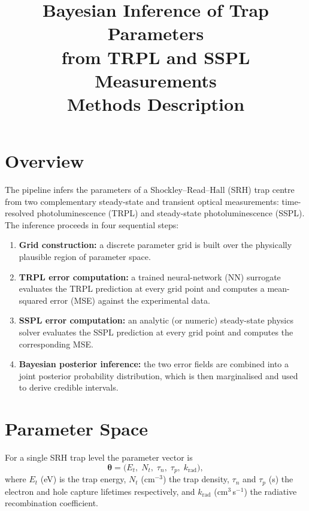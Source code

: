 \documentclass[a4paper,11pt]{article}
\title{\textbf{Bayesian Inference of Trap Parameters\\from TRPL and SSPL Measurements}\\[0.4em]
\large Methods Description}
\author{}
\date{}
\newcommand{\btheta}{\boldsymbol{\theta}}
\begin{document}
\maketitle
\tableofcontents
\newpage

\section{Overview}

The pipeline infers the parameters of a Shockley--Read--Hall (SRH) trap centre
from two complementary steady-state and transient optical measurements:
time-resolved photoluminescence (TRPL) and steady-state photoluminescence
(SSPL). The inference proceeds in four sequential steps:

\begin{enumerate}
  \item \textbf{Grid construction:} a discrete parameter grid is built over
        the physically plausible region of parameter space.
  \item \textbf{TRPL error computation:} a trained neural-network (NN)
        surrogate evaluates the TRPL prediction at every grid point and
        computes a mean-squared error (MSE) against the experimental data.
  \item \textbf{SSPL error computation:} an analytic (or numeric)
        steady-state physics solver evaluates the SSPL prediction at every
        grid point and computes the corresponding MSE.
  \item \textbf{Bayesian posterior inference:} the two error fields are
        combined into a joint posterior probability distribution, which is
        then marginalised and used to derive credible intervals.
\end{enumerate}

\section{Parameter Space}

For a single SRH trap level the parameter vector is
\begin{equation}
  \btheta = \bigl(E_t,\; N_t,\; \tau_n,\; \tau_p,\; k_\mathrm{rad}\bigr),
\end{equation}
where $E_t$ (eV) is the trap energy, $N_t$ (cm$^{-3}$) the trap density,
$\tau_n$ and $\tau_p$ (s) the electron and hole capture lifetimes
respectively, and $k_\mathrm{rad}$ (cm$^3$\,s$^{-1}$) the radiative
recombination coefficient.
\end{document}
